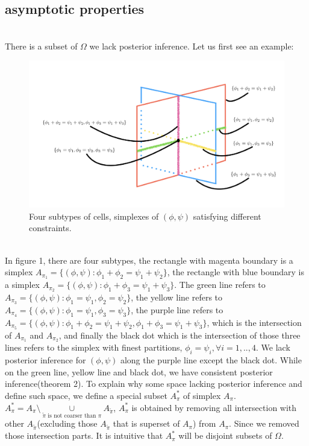 \documentclass[11pt]{amsart}
\begin{document}
\subsection{asymptotic properties}\hfill\\
There is a subset of $\Omega$ we lack posterior inference. Let us first see an example:
\begin{figure}[h]
\includegraphics[scale = 0.5]{overlap.png}
 \caption{Four subtypes of cells,  simplexes of $(\phi,\psi)$ satisfying different constraints.}
  \label{fig:1}
\end{figure}
\hfill\\
In figure 1, there are four subtypes, the rectangle with magenta boundary is a simplex $A_{\pi_1} = \{(\phi,\psi) : \phi_1 + \phi_2 = \psi_1 + \psi_2\}$, the rectangle with blue boundary is a simplex $A_{\pi_2} = \{(\phi,\psi) : \phi_1 + \phi_3 = \psi_1 + \psi_3\}$. The green line refers to $A_{\pi_3} = \{(\phi,\psi) : \phi_1 = \psi_1, \phi_2 = \psi_2\}$, the yellow line refers to $A_{\pi_4} = \{(\phi,\psi) : \phi_1 = \psi_1, \phi_3 = \psi_3\}$, the purple line refers to $A_{\pi_5} = \{(\phi,\psi) : \phi_1 + \phi_2 = \psi_1 + \psi_2, \phi_1 + \phi_3 = \psi_1 + \psi_3\}$, which is the intersection of $A_{\pi_1}$ and $A_{\pi_2}$, and finally the black dot which is the intersection of those three lines refers to the simplex with finest partitions, $\phi_i = \psi_i, \forall i = 1,..,4$. We lack posterior inference for $(\phi,\psi)$ along the purple line except the black dot. While on the green line, yellow line and black dot, we have consistent posterior inference(theorem 2). To explain why some space lacking posterior inference and define such space, we define a special subset $A_\pi^*$ of simplex $A_\pi$. $A_\pi^* = A_\pi\setminus \underset{\tilde{\pi} \text{ is not coarser than } \pi }\cup A_{\tilde{\pi}}$, $A_\pi^*$ is obtained by removing all intersection with other $A_{\tilde{\pi}}$(excluding those $A_{\tilde{\pi}}$ that is superset of $A_\pi$) from $A_\pi$. Since we removed those intersection parts. It is intuitive that $A_\pi^*$ will be disjoint subsets of $\Omega$.\\
\end{document}
